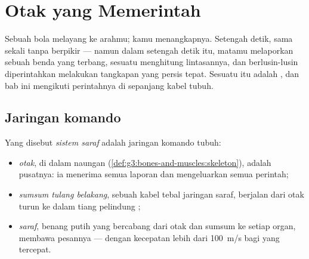 \chapter{Otak yang Memerintah}\label{ch:g5:brain-in-command}

Sebuah bola melayang ke arahmu; kamu menangkapnya. Setengah detik,
sama sekali tanpa berpikir --- namun dalam setengah detik itu, matamu
melaporkan sebuah benda yang terbang, sesuatu menghitung lintasannya,
dan berlusin-lusin  diperintahkan melakukan tangkapan yang persis
tepat. Sesuatu itu adalah , dan bab ini mengikuti perintahnya di
sepanjang kabel tubuh.

\section{Jaringan komando}

\begin{definition}\label{def:g5:brain-in-command:system}
Yang disebut \emph{sistem saraf} adalah jaringan
komando tubuh:
\begin{itemize}
  \item \emph{otak}, di dalam naungan 
        (\cref{def:g3:bones-and-muscles:skeleton}), adalah pusatnya:
        ia menerima semua laporan dan mengeluarkan semua perintah;
  \item \emph{sumsum tulang belakang},
        sebuah kabel tebal jaringan saraf, berjalan dari otak turun ke
        dalam tiang pelindung ;
  \item \emph{saraf}, benang putih yang bercabang dari
        otak dan sumsum  ke setiap organ, membawa
        pesannya --- dengan kecepatan lebih dari
        \qty{100}{m/s} bagi yang tercepat.
\end{itemize}
\end{definition}


